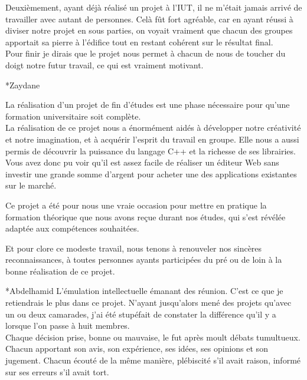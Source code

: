 \documentclass[a4paper, 12pt]{report}
\begin{document}
\begin{chapter}
\begin{section}
		Deuxièmement, ayant déjà réalisé un projet à l'IUT, il ne m'était jamais arrivé de travailler avec autant de personnes. Celà fût fort
		agréable, car en ayant réussi à diviser notre projet en sous parties, on voyait vraiment que chacun des groupes apportait sa pierre à
		l'édifice tout en restant cohérent sur le résultat final.\\

		Pour finir je dirais que le projet nous permet à chacun de nous de toucher du doigt notre futur travail, ce qui est vraiment motivant.
		\end{section}

		\begin{section}*{Zaydane}

		La réalisation d’un projet de fin d’études est une phase nécessaire pour qu’une formation universitaire soit complète.\\
		La réalisation de ce projet nous a énormément aidés à développer notre créativité et notre imagination, et à acquérir l’esprit du travail en
		groupe. Elle nous a aussi permis de découvrir la puissance du langage C++ et la richesse de ses librairies.
		Vous avez donc pu voir qu’il est assez facile de réaliser un éditeur Web sans investir une grande somme d’argent pour acheter une des
		applications existantes sur le marché.

		Ce projet a été pour nous une vraie occasion pour mettre en pratique la formation théorique que nous avons reçue durant nos études, qui s’est
		révélée adaptée aux compétences souhaitées.

		Et pour clore ce modeste travail, nous tenons  à renouveler nos sincères reconnaissances, à toutes personnes ayants participées du pré ou de
		 loin à la bonne réalisation de ce projet. 
		\end{section}

		\begin{section}*{Abdelhamid}
		L'émulation intellectuelle émanant des réunion. C'est ce que je retiendrais le plus dans ce projet. N'ayant jusqu'alors mené des projets
		qu'avec un ou deux camarades, j'ai été stupéfait de constater la différence qu'il y a lorsque l'on passe à huit membres.\\

		Chaque décision prise, bonne ou mauvaise, le fut après moult débats tumultueux. Chacun apportant son avis, son expérience, ses idées,
		ses opinions et son jugement. Chacun écouté de la même manière, plébiscité s'il avait raison, informé sur ses erreurs s'il avait tort.\\


\end{section}
\end{chapter}
\end{document}
